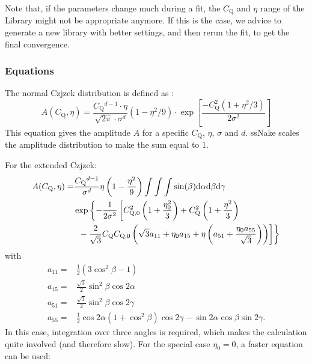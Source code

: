 \documentclass[11pt,a4paper]{article}
\begin{document}
Note that, if the parameters change much during a fit, the $C_\text{Q}$ and $\eta$ range of the
Library might not be appropriate anymore. If this is the case, we advice to generate a new library
with better settings, and then rerun the fit, to get the final convergence.


\subsubsection*{Equations}

The normal Czjzek distribution is defined as \cite{Grimminck2011Easy}:
\begin{equation}
  A(C_\text{Q},\eta) = \frac{C_\text{Q}{}^{d - 1} \cdot \eta}{\sqrt{2\pi} \cdot \sigma^d} (1 - \eta^2 / 9) \cdot
  \exp\left[\frac{-C_\text{Q}^2 (1 + \eta^2/3)} {2\sigma^2}   \right]
\end{equation}
This equation gives the amplitude $A$ for a specific $C_\text{Q}$, $\eta$, $\sigma$ and $d$. ssNake
scales the amplitude distribution to make the sum equal to 1.


For the extended Czjzek:
\begin{align}
  A(C_\text{Q},\eta) = & \frac{C_\text{Q}{}^{d-1}}{\sigma^d} \eta \left(1 - \frac{\eta^2}{9} \right)
  \int \int \int \sin(\beta) \text{d}\alpha \text{d}\beta \text{d}\gamma \nonumber \\
  & \exp \left\{ -\frac{1}{2\sigma^2} \left[ C_\text{Q,0}^2 \left(1 + \frac{\eta_0^2}{3}\right) +
  C_\text{Q}^2 \left(1+ \frac{\eta^2}{3}\right) \right.\right. \\
  & \left.\vphantom{\frac{a^1}{1}} \left.\vphantom{\frac{a^1}{1}} - \frac{2}{\sqrt{3}} C_\text{Q} C_\text{Q,0} \left( \sqrt{3} a_{11} + \eta_0 a_{15} + \eta \left(
 a_{51} + \frac{\eta_0 a_{55}}{\sqrt{3}} \right) \right) \right] \right\} \nonumber
\end{align}
with
\begin{align}
  a_{11} = & \frac{1}{2} (3\cos^2\beta - 1)\\
  a_{15} = & \frac{\sqrt{3}}{2} \sin^2\beta \cos 2\alpha \\
  a_{51} = & \frac{\sqrt{3}}{2} \sin^2\beta \cos 2\gamma \\
  a_{55} = & \frac{1}{2} \cos 2\alpha (1 + \cos^2\beta) \cos2\gamma - \sin 2 \alpha \cos \beta \sin
  2 \gamma.
\end{align}
In this case, integration over three angles is required, which makes the calculation quite involved
(and therefore slow). For the special case $\eta_0=0$, a faster equation can be used:
\end{document}
